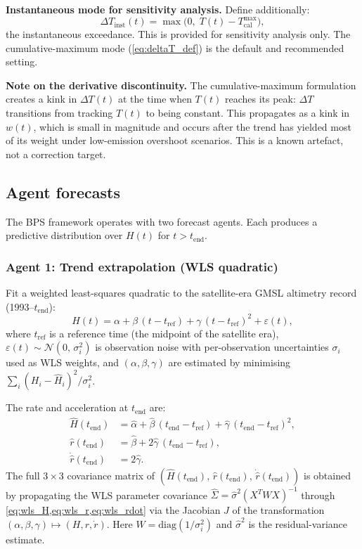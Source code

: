 \documentclass[11pt]{article}
\newcommand{\dT}{\Delta T}
\newcommand{\tcal}{T_{\mathrm{cal}}^{\max}}
\newcommand{\tend}{t_{\mathrm{end}}}
\begin{document}
\textbf{Instantaneous mode for sensitivity analysis.}  Define additionally:
\begin{equation}
  \dT_{\mathrm{inst}}(t) = \max\!\big(0,\; T(t) - \tcal\big),
  \label{eq:deltaT_inst}
\end{equation}
the instantaneous exceedance.  This is provided for sensitivity analysis only.  The cumulative-maximum mode (\cref{eq:deltaT_def}) is the default and recommended setting.

\textbf{Note on the derivative discontinuity.}  The cumulative-maximum formulation creates a kink in $\dT(t)$ at the time when $T(t)$ reaches its peak: $\dT$ transitions from tracking $T(t)$ to being constant.  This propagates as a kink in $w(t)$, which is small in magnitude and occurs after the trend has yielded most of its weight under low-emission overshoot scenarios.  This is a known artefact, not a correction target.


\subsection{Agent forecasts}
\label{sec:agents}

The BPS framework operates with two forecast agents.  Each produces a predictive distribution over $H(t)$ for $t > \tend$.

\subsubsection{Agent 1: Trend extrapolation (WLS quadratic)}
\label{sec:trend_agent}

Fit a weighted least-squares quadratic to the satellite-era GMSL altimetry record (1993--$\tend$):
\begin{equation}
  H(t) = \alpha + \beta\,(t - t_{\mathrm{ref}}) + \gamma\,(t - t_{\mathrm{ref}})^2 + \varepsilon(t),
  \label{eq:wls_model}
\end{equation}
where $t_{\mathrm{ref}}$ is a reference time (the midpoint of the satellite era), $\varepsilon(t) \sim \mathcal{N}(0,\,\sigma_i^2)$ is observation noise with per-observation uncertainties $\sigma_i$ used as WLS weights, and $(\alpha, \beta, \gamma)$ are estimated by minimising $\sum_i (H_i - \hat{H}_i)^2 / \sigma_i^2$.

The rate and acceleration at $\tend$ are:
\begin{align}
  \hat{H}(\tend) &= \hat\alpha + \hat\beta\,(\tend - t_{\mathrm{ref}}) + \hat\gamma\,(\tend - t_{\mathrm{ref}})^2, \label{eq:wls_H}\\
  \hat{r}(\tend) &= \hat\beta + 2\hat\gamma\,(\tend - t_{\mathrm{ref}}), \label{eq:wls_r}\\
  \dot{\hat{r}}(\tend) &= 2\hat\gamma. \label{eq:wls_rdot}
\end{align}
The full $3 \times 3$ covariance matrix of $(\hat{H}(\tend),\, \hat{r}(\tend),\, \dot{\hat{r}}(\tend))$ is obtained by propagating the WLS parameter covariance $\hat\Sigma = \hat\sigma^2 (X^T W X)^{-1}$ through \cref{eq:wls_H,eq:wls_r,eq:wls_rdot} via the Jacobian $J$ of the transformation $(\alpha, \beta, \gamma) \mapsto (H, r, \dot{r})$.  Here $W = \mathrm{diag}(1/\sigma_i^2)$ and $\hat\sigma^2$ is the residual-variance estimate.
\end{document}
